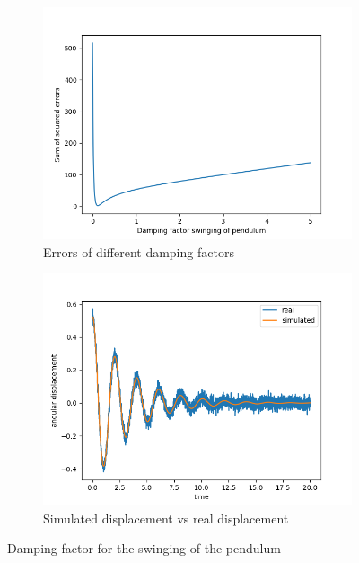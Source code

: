 \documentclass{article}
\begin{document}
\begin{figure}[h]
    \begin{subfigure}[b]{0.5\textwidth}
        \includegraphics[width=\linewidth]{graphs/dp_calibration.png}
        \caption{Errors of different damping factors}
    \end{subfigure}
    \begin{subfigure}[b]{0.5\textwidth}
        \includegraphics[width=\linewidth]{graphs/dp_displacement_error.png}
        \caption{Simulated displacement vs real displacement}
    \end{subfigure}
    \caption{Damping factor for the swinging of the pendulum}
    \label{fig:dp}
\end{figure}
\end{document}
